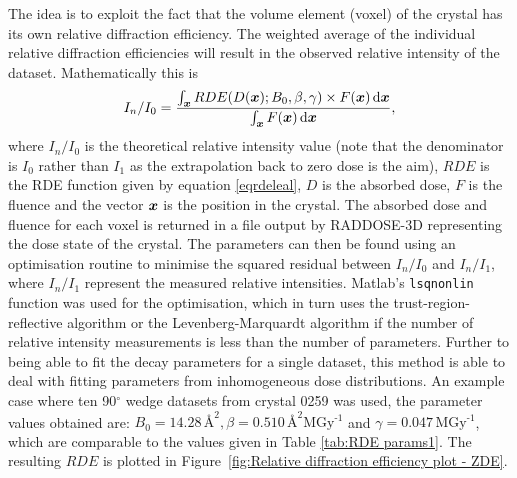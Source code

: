 The idea is to exploit the fact that the volume element (voxel) of the crystal has its own relative diffraction efficiency.
The weighted average of the individual relative diffraction efficiencies will result in the observed relative intensity of the dataset.
Mathematically this is
\begin{equation}
    I_n/I_0 = \frac{\int_{\boldsymbol{x}} RDE(D(\boldsymbol{x}); B_0, \beta, \gamma) \times F(\boldsymbol{x})\,\mathrm{d}\boldsymbol{x}}{\int_{\boldsymbol{x}} F(\boldsymbol{x})\,\mathrm{d}\boldsymbol{x}},
\end{equation}
where $I_n/I_0$ is the theoretical relative intensity value (note that the denominator is $I_0$ rather than $I_1$ as the extrapolation back to zero dose is the aim), $RDE$ is the RDE function given by equation \ref{eqrdeleal}, $D$ is the absorbed dose, $F$ is the fluence and the vector $\boldsymbol{x}$ is the position in the crystal.
The absorbed dose and fluence for each voxel is returned in a file output by RADDOSE-3D representing the dose state of the crystal.
The parameters can then be found using an optimisation routine to minimise the squared residual between $I_n/I_0$ and $I_n/I_1$, where $I_n/I_1$ represent the measured relative intensities.
Matlab's \verb+lsqnonlin+ function was used for the optimisation, which in turn uses the trust-region-reflective algorithm \cite{coleman1996} or the Levenberg-Marquardt algorithm \cite{more1978levenberg} if the number of relative intensity measurements is less than the number of parameters.
Further to being able to fit the decay parameters for a single dataset, this method is able to deal with fitting parameters from inhomogeneous dose distributions.
An example case where ten 90$^{\circ}$ wedge datasets from crystal 0259 was used, the parameter values obtained are: $B_0 = 14.28\,\text{\AA}^2, \beta = 0.510\,\text{\AA}^2 \text{MGy}^{\text{-1}}$ and $\gamma = 0.047\,\text{MGy}^{\text{-1}}$, which are comparable to the values given in Table \ref{tab:RDE params1}.
The resulting $RDE$ is plotted in Figure~\ref{fig:Relative diffraction efficiency plot - ZDE}.
